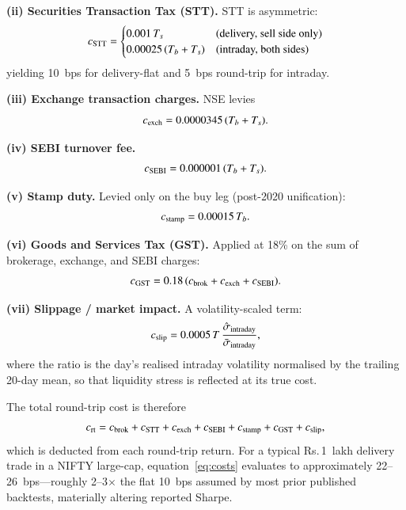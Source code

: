 \textbf{(ii) Securities Transaction Tax (STT).} STT is asymmetric:
\begin{equation}
c_{\rm STT} = \begin{cases}
   0.001\,T_s & \text{(delivery, sell side only)}\\
   0.00025\,(T_b+T_s) & \text{(intraday, both sides)}
\end{cases}
\label{eq:stt}
\end{equation}
yielding 10~bps for delivery-flat and 5~bps round-trip for intraday.

\textbf{(iii) Exchange transaction charges.} NSE levies
\begin{equation}
c_{\rm exch} = 0.0000345\,(T_b+T_s).
\label{eq:exch}
\end{equation}

\textbf{(iv) SEBI turnover fee.}
\begin{equation}
c_{\rm SEBI} = 0.000001\,(T_b+T_s).
\label{eq:sebi}
\end{equation}

\textbf{(v) Stamp duty.} Levied only on the buy leg (post-2020 unification):
\begin{equation}
c_{\rm stamp} = 0.00015\,T_b.
\label{eq:stamp}
\end{equation}

\textbf{(vi) Goods and Services Tax (GST).} Applied at 18\% on the
sum of brokerage, exchange, and SEBI charges:
\begin{equation}
c_{\rm GST} = 0.18\,(c_{\rm brok}+c_{\rm exch}+c_{\rm SEBI}).
\label{eq:gst}
\end{equation}

\textbf{(vii) Slippage / market impact.} A volatility-scaled term:
\begin{equation}
c_{\rm slip} = 0.0005\,T\,\frac{\hat{\sigma}_{\rm intraday}}{\bar{\sigma}_{\rm intraday}},
\label{eq:slip}
\end{equation}
where the ratio is the day's realised intraday volatility normalised by the
trailing 20-day mean, so that liquidity stress is reflected at its true cost.

The total round-trip cost is therefore
\begin{equation}
c_{\rm rt} = c_{\rm brok} + c_{\rm STT} + c_{\rm exch}
           + c_{\rm SEBI} + c_{\rm stamp} + c_{\rm GST} + c_{\rm slip},
\label{eq:costs}
\end{equation}
which is deducted from each round-trip return. For a typical Rs.\,1~lakh
delivery trade in a NIFTY large-cap, equation~\eqref{eq:costs} evaluates
to approximately 22--26~bps---roughly 2--3$\times$ the flat 10~bps assumed
by most prior published backtests, materially altering reported Sharpe.

